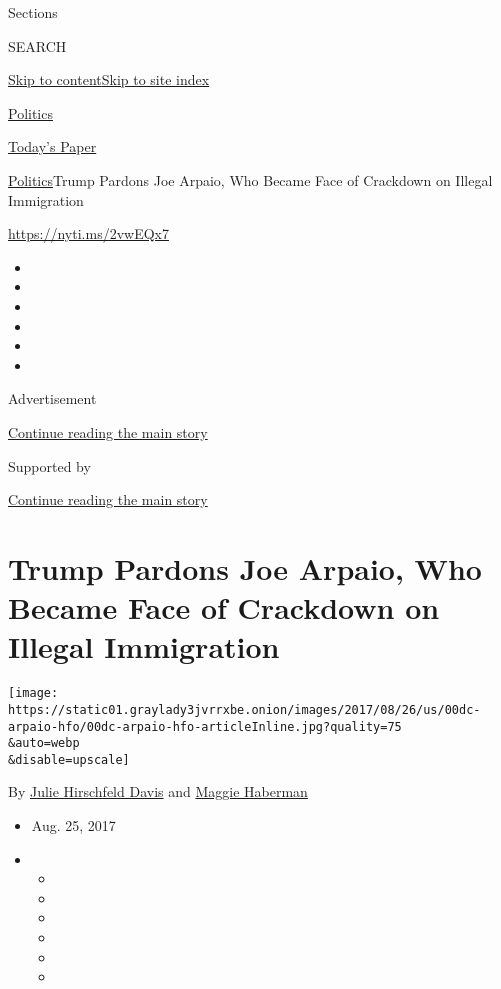 Sections

SEARCH

\protect\hyperlink{site-content}{Skip to
content}\protect\hyperlink{site-index}{Skip to site index}

\href{https://www.nytimes3xbfgragh.onion/section/politics}{Politics}

\href{https://myaccount.nytimes3xbfgragh.onion/auth/login?response_type=cookie\&client_id=vi}{}

\href{https://www.nytimes3xbfgragh.onion/section/todayspaper}{Today's
Paper}

\href{/section/politics}{Politics}\textbar{}Trump Pardons Joe Arpaio,
Who Became Face of Crackdown on Illegal Immigration

\url{https://nyti.ms/2vwEQx7}

\begin{itemize}
\item
\item
\item
\item
\item
\item
\end{itemize}

Advertisement

\protect\hyperlink{after-top}{Continue reading the main story}

Supported by

\protect\hyperlink{after-sponsor}{Continue reading the main story}

\hypertarget{trump-pardons-joe-arpaio-who-became-face-of-crackdown-on-illegal-immigration}{%
\section{Trump Pardons Joe Arpaio, Who Became Face of Crackdown on
Illegal
Immigration}\label{trump-pardons-joe-arpaio-who-became-face-of-crackdown-on-illegal-immigration}}

\texttt{[image: https://static01.graylady3jvrrxbe.onion/images/2017/08/26/us/00dc-arpaio-hfo/00dc-arpaio-hfo-articleInline.jpg?quality=75\\\&auto=webp\\\&disable=upscale]}

By
\href{https://www.nytimes3xbfgragh.onion/by/julie-hirschfeld-davis}{Julie
Hirschfeld Davis} and
\href{http://www.nytimes3xbfgragh.onion/by/maggie-haberman}{Maggie
Haberman}

\begin{itemize}
\item
  Aug. 25, 2017
\item
  \begin{itemize}
  \item
  \item
  \item
  \item
  \item
  \item
  \end{itemize}
\end{itemize}

